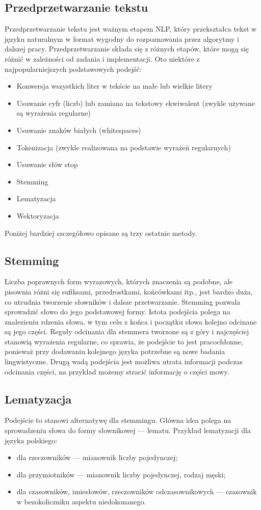 	\subsection{Przedprzetwarzanie tekstu}
		Przedprzetwarzanie tekstu jest ważnym etapem NLP, który przekształca tekst w języku naturalnym w format wygodny do rozpoznawania przez algorytmy i dalszej pracy. Przedprzetwarzanie składa się z różnych etapów, które mogą się różnić w zależności od zadania i implementacji. Oto niektóre z najpopularniejszych podstawowych podejść:
	\begin{itemize}
		\item Konwersja wszystkich liter w tekście na małe lub wielkie litery
		\item Usuwanie cyfr (liczb) lub zamiana na tekstowy ekwiwalent (zwykle używane są wyrażenia regularne)
		\item Usuwanie znaków białych (whitespaces)
		\item Tokenizacja (zwykle realizowana na podstawie wyrażeń regularnych)
		\item Usuwanie słów stop
		\item Stemming
		\item Lematyzacja
		\item Wektoryzacja
	\end{itemize}
	Poniżej bardziej szczegółowo opisane są trzy ostatnie metody.



	\subsection{Stemming}
		Liczba poprawnych form wyrazowych, których znaczenia są podobne, ale pisownia różni się sufiksami, przedrostkami, końcówkami itp., jest bardzo duża, co utrudnia tworzenie słowników i dalsze przetwarzanie. Stemming pozwala sprowadzić słowo do jego podstawowej formy. Istota podejścia polega na znalezieniu rdzenia słowa, w tym celu z końca i początku słowa kolejno odcinane są jego części. Reguły odcinania dla stemmera tworzone są z góry i najczęściej stanowią wyrażenia regularne, co sprawia, że podejście to jest pracochłonne, ponieważ przy dodawaniu kolejnego języka potrzebne są nowe badania lingwistyczne. Drugą wadą podejścia jest możliwa utrata informacji podczas odcinania części, na przykład możemy stracić informację o części mowy.

	\subsection{Lematyzacja}
		Podejście to stanowi alternatywę dla stemmingu. Główna idea polega na sprowadzeniu słowa do formy słownikowej — lematu. Przykład lematyzacji dla języka polskiego:
		\begin{itemize}
			\item dla rzeczowników — mianownik liczby pojedynczej;
			\item dla przymiotników — mianownik liczby pojedynczej, rodzaj męski;
			\item dla czasowników, imiesłowów, rzeczowników odczasownikowych — czasownik w bezokoliczniku aspektu niedokonanego.
		\end{itemize}
		

